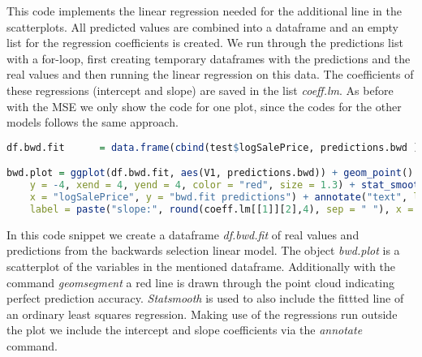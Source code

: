 This code implements the linear regression needed for the additional line in the scatterplots. All predicted values are combined into a dataframe and an empty list for the regression coefficients is created. We run through the predictions list with a for-loop, first creating temporary dataframes with the predictions and the real values and then running the linear regression on this data. The coefficients of these  regressions (intercept and slope) are saved in the list \textit{coeff.lm}. As before with the MSE we only show the code for one plot, since  the codes for the other models follows the same approach.
\begin{lstlisting}[language=R]
df.bwd.fit      = data.frame(cbind(test$logSalePrice, predictions.bwd ))  # creating dataframe containing real and predicted outcome

bwd.plot = ggplot(df.bwd.fit, aes(V1, predictions.bwd)) + geom_point() + geom_segment(x = -4, 
    y = -4, xend = 4, yend = 4, color = "red", size = 1.3) + stat_smooth(method = "lm", se = FALSE) + labs(title = "Backward selection linear model", 
    x = "logSalePrice", y = "bwd.fit predictions") + annotate("text", label = paste("int:", round(coeff.lm[[1]][1],4), sep = " "), x = -3, y = 3, size =10, color = "blue") + annotate("text", 
    label = paste("slope:", round(coeff.lm[[1]][2],4), sep = " "), x = -3, y = 2.5, size =10, color = "blue") + theme_classic(base_size = 20) 
\end{lstlisting} 
In this code snippet we create a dataframe \textit{df.bwd.fit} of real values and predictions from the backwards selection linear model. The object \textit{bwd.plot} is a scatterplot of the variables in the mentioned dataframe. Additionally with the command \textit{geomsegment} a red line is drawn through the point cloud indicating perfect prediction accuracy. \textit{Statsmooth} is used to also include the fittted line of an ordinary least squares regression. Making use of the regressions run outside the plot we include the intercept and slope coefficients via the \textit{annotate} command.   